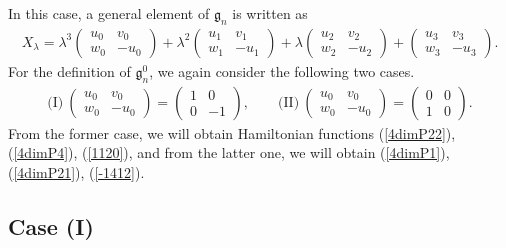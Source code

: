 \documentclass[pdftex]{sigma}
\numberwithin{equation}{section}
\begin{document}
In this case, a general element of $\mathfrak{g}_n$ is written as
\begin{gather*}
X_\lambda = \lambda ^3 \left(
\begin{matrix}
u_0 & v_0 \\
w_0 & -u_0
\end{matrix}
\right) + \lambda^2 \left(
\begin{matrix}
u_1 & v_1 \\
w_1 & -u_1
\end{matrix}
\right) + \lambda \left(
\begin{matrix}
u_2 & v_2 \\
w_2 & -u_2
\end{matrix}
\right) + \left(
\begin{matrix}
u_3 & v_3 \\
w_3 & -u_3
\end{matrix}
\right).
\end{gather*}
For the def\/inition of $\mathfrak{g}^0_n$, we again consider the following two cases.
\begin{gather*}
\text{(I)}\ \left(
\begin{matrix}
u_0 & v_0 \\
w_0 & -u_0
\end{matrix}
\right) = \left(
\begin{matrix}
1 & 0 \\
0 & -1
\end{matrix}
\right), \qquad \text{(II)}\ \left(
\begin{matrix}
u_0 & v_0 \\
w_0 & -u_0
\end{matrix}
\right) = \left(
\begin{matrix}
0 & 0 \\
1 & 0
\end{matrix}
\right).
\end{gather*}
From the former case, we will obtain Hamiltonian functions (\ref{4dimP22}), (\ref{4dimP4}), (\ref{1120}), and from the latter one, we will obtain (\ref{4dimP1}), (\ref{4dimP21}), (\ref{-1412}).

\subsection{Case (I)}\label{section4.1}
\end{document}
